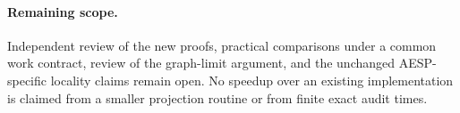 \paragraph{Remaining scope.}
Independent review of the new proofs, practical comparisons under a common
work contract, review of the graph-limit argument, and the unchanged AESP-specific
locality claims remain open. No speedup over an existing implementation is
claimed from a smaller projection routine or from finite exact audit times.
